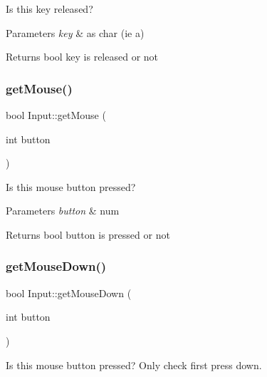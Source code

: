 Is this key released? 


\begin{DoxyParams}{Parameters}
{\em key} & as char (ie \textquotesingle{}a\textquotesingle{}) \\
\hline
\end{DoxyParams}
\begin{DoxyReturn}{Returns}
bool key is released or not 
\end{DoxyReturn}
\mbox{\label{class_input_a3e7ca67c5c02f7e6516013c987339d05}} 
\subsubsection{\texorpdfstring{get\+Mouse()}{getMouse()}}
{\footnotesize\ttfamily bool Input\+::get\+Mouse (\begin{DoxyParamCaption}\item[{int}]{button }\end{DoxyParamCaption})\hspace{0.3cm}{\ttfamily [inline]}}



Is this mouse button pressed? 


\begin{DoxyParams}{Parameters}
{\em button} & num \\
\hline
\end{DoxyParams}
\begin{DoxyReturn}{Returns}
bool button is pressed or not 
\end{DoxyReturn}
\mbox{\label{class_input_aac8e9e5714c33bc9d3e478e2472fdc10}} 
\subsubsection{\texorpdfstring{get\+Mouse\+Down()}{getMouseDown()}}
{\footnotesize\ttfamily bool Input\+::get\+Mouse\+Down (\begin{DoxyParamCaption}\item[{int}]{button }\end{DoxyParamCaption})\hspace{0.3cm}{\ttfamily [inline]}}



Is this mouse button pressed? Only check first press down. 


